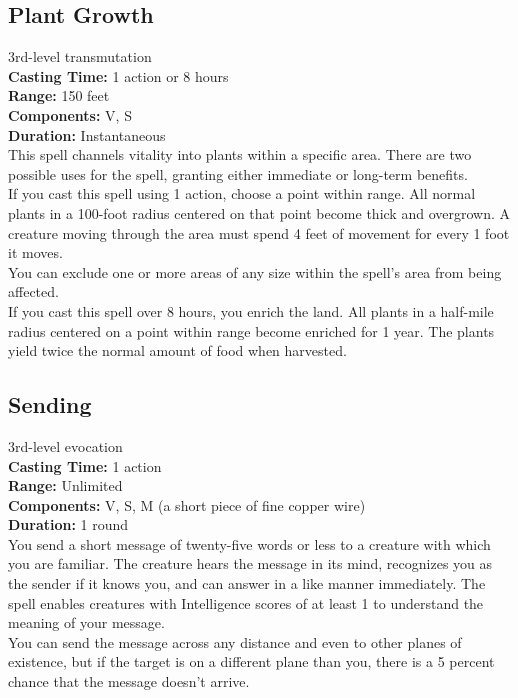 \documentclass[11pt, A4paper, english]{article}
\begin{document}
		\subsection{Plant Growth}
3rd-level transmutation \\
\textbf{Casting Time:} 1 action or 8 hours \\
\textbf{Range:} 150 feet \\
\textbf{Components:} V, S \\
\textbf{Duration:} Instantaneous \\
This spell channels vitality into plants within a specific area. There are two possible uses for the spell, granting either immediate or long-term benefits. \\
If you cast this spell using 1 action, choose a point within range. All normal plants in a 100-foot radius centered on that point become thick and overgrown. A creature moving through the area must spend 4 feet of movement for every 1 foot it moves. \\
You can exclude one or more areas of any size within the spell’s area from being affected. \\
If you cast this spell over 8 hours, you enrich the land. All plants in a half-mile radius centered on a point within range become enriched for 1 year. The plants yield twice the normal amount of food when harvested.

		\subsection{Sending}
3rd-level evocation \\
\textbf{Casting Time:} 1 action \\
\textbf{Range:} Unlimited \\
\textbf{Components:} V, S, M (a short piece of fine copper wire) \\
\textbf{Duration:} 1 round \\
You send a short message of twenty-five words or less to a creature with which you are familiar. The creature hears the message in its mind, recognizes you as the sender if it knows you, and can answer in a like manner immediately. The spell enables creatures with Intelligence scores of at least 1 to understand the meaning of your message. \\
You can send the message across any distance and even to other planes of existence, but if the target is on a different plane than you, there is a 5 percent chance that the message doesn’t arrive.
\end{document}
